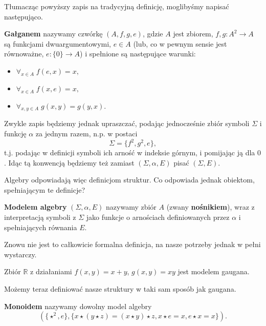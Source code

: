 Tłumacząc powyższy zapis na tradycyjną definicję, moglibyśmy napisać następująco.
\begin{definition}
	\textbf{Gałganem} nazywamy czwórkę $(A, f, g, e)$,
		gdzie $A$ jest zbiorem,
		$f, g: A^2 \to A$ są funkcjami dwuargumentowymi,
		$e \in A$ (lub, co w pewnym sensie jest równoważne, $e: \{0\} \to A$)
		i spełnione są następujące warunki:
	\begin{itemize}
		\item $\forall_{x\in A}\; f(e, x) = x,$
		\item $\forall_{x\in A}\; f(x, e) = x,$
		\item $\forall_{x,y\in A}\; g(x, y) = g(y, x).$
	\end{itemize}
\end{definition}

Zwykle zapis będziemy jednak upraszczać,
	podając jednocześnie zbiór symboli $\Sigma$ i funkcję $\alpha$ za jednym razem,
	n.p. w postaci
\begin{equation}
	\Sigma = \{f^2, g^2, e\},
\end{equation}
t.j. podając w definicji symboli ich arność w indeksie górnym, i pomijając ją dla $0$.
Idąc tą konwencją będziemy też zamiast $(\Sigma, \alpha, E)$ pisać $(\Sigma, E)$.

Algebry odpowiadają więc definicjom struktur.
Co odpowiada jednak obiektom, spełniającym te definicje?

\begin{definition}
    \textbf{Modelem algebry} $(\Sigma, \alpha, E)$ nazywamy zbiór $A$ (zwany \textbf{nośnikiem}),
	wraz z interpretacją symboli z $\Sigma$ jako funkcje o arnościach definiowanych przez $\alpha$ i spełniających równania $E$.
\end{definition}
Znowu nie jest to całkowicie formalna definicja,
na nasze potrzeby jednak w pełni wystarczy.

\begin{example}
	Zbiór $\mathbb{R}$ z działaniami $f(x, y) = x + y$, $g(x, y) = xy$ jest modelem gaugana.
\end{example}

Możemy teraz definiować nasze struktury w taki sam sposób jak gaugana.
\begin{definition}
	\textbf{Monoidem} nazywamy dowolny model algebry
	\begin{equation*}
		(\{\star^2, e\}, \{ x \star (y \star z) = (x \star y) \star z, x \star e = x, e \star x = x \}).
	\end{equation*}
\end{definition}

